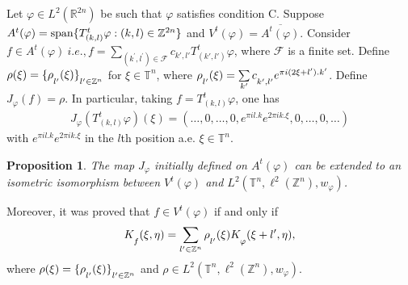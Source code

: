 \documentclass[a4paper,12pt,reqno]{amsart}
\theoremstyle{plain}
\numberwithin{equation}{section}
\newtheorem{prop}{Proposition}[section]
\theoremstyle{definition}
\newcommand{\ds}{\displaystyle}
\begin{document}
Let $\varphi\in L^{2}(\mathbb{R}^{2n})$ be such that $\varphi$ satisfies condition C. Suppose $A^{t}(\varphi)={\rm span}\{T_{(k,l)}^{t}\varphi\\:{(k,l)\in \mathbb{Z}^{2n}}\}$ and $V^{t}(\varphi)=\overline{A^{t}(\varphi)}$. Consider $f\in A^{t}(\varphi)~i.e., f= \sum\limits_{(k^{\prime},l^{\prime})\in\mathcal{F}}c_{k',l'}T_{(k',l')}^{t}\varphi$, where $\mathcal{F}$ is a finite set. Define $\rho(\xi)=\{\fontdimen16\textfont2=5pt \rho_{l^{\prime}}(\xi)\}_{l^{\prime}\in\mathbb {Z}^{n}}$ for $\xi\in\mathbb {T}^{n}$, where
$\fontdimen16\textfont2=5pt \rho_{l^{\prime}}(\xi)=\sum\limits_{k^{\prime}}c_{k^{\prime},l^{\prime}}e^{\pi i(2\xi+l^{\prime}).k^{\prime}}$. Define $J_{\varphi}(f)=\rho$. In particular, taking $f=T_{(k,l)}^{t}\varphi$, one has
\begin{eqnarray}
J_{\varphi}(T_{(k,l)}^{t}\varphi)(\xi)=(\dotsc ,0,\dotsc ,0,e^{\pi il.k}e^{2\pi ik.\xi},0,\dotsc ,0,\dotsc)\label{3peq8}
\end{eqnarray}
with $e^{\pi il.k}e^{2\pi ik.\xi}$ in the $l$th position a.e. $\xi\in\mathbb{T}^{n}$.
\begin{prop}\label{3pprop1} \cite{ras}
The map $J_{\varphi}$ initially defined on $A^{t}(\varphi)$ can be extended to an isometric isomorphism between $V^{t}(\varphi)$ and $L^{2}(\mathbb {T}^{n},\ell^{2}(\mathbb {Z}^{n}),w_{\varphi})$.
\end{prop}
Moreover, it was proved that  $f\in V^{t}(\varphi)$ if and only if
\begin{eqnarray}\label{3peq2}
K_{f}(\xi,\eta)=\ds\sum\limits_{l^{\prime}\in\mathbb {Z}^{n}}\fontdimen16\textfont2=5pt \rho_{l^{\prime}}(\xi)K_{\varphi}(\xi+l',\eta),
\end{eqnarray}
where $\rho(\xi)= \{\fontdimen16\textfont2=5pt \rho_{l^{\prime}}(\xi)\}_{l^{\prime}\in\mathbb {Z}^{n}}$ and $\rho\in L^{2}(\mathbb {T}^{n},\ell^{2}(\mathbb {Z}^{n}),w_{\varphi})$.
\end{document}
